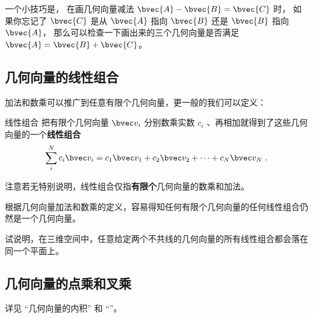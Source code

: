 一个小技巧是， 在画几何向量减法 $\bvec{A} - \bvec{B} = \bvec{C}$ 时， 如果你忘记了 $\bvec{C}$ 是从 $\bvec{A}$ 指向 $\bvec{B}$ 还是 $\bvec{B}$ 指向 $\bvec{A}$， 那么可以检查一下画出来的三个几何向量是否满足 $\bvec{A} = \bvec{B} + \bvec{C}$。


\subsection{几何向量的线性组合}

加法和数乘可以推广到任意有限个几何向量，更一般的我们可以定义：
\begin{definition}{线性组合}
把有限个几何向量 $\bvec v_i$ 分别数乘实数 $c_i$ 、再相加就得到了这些几何向量的一个\textbf{线性组合}
\begin{equation}\label{eq_GVecOp_1}
\sum_i^N c_i \bvec v_i = c_1\bvec v_1 + c_2\bvec v_2 +\dots +c_N \bvec v_N~.
\end{equation}
\end{definition}
注意若无特别说明，线性组合仅指\textbf{有限个}几何向量的数乘和加法。


根据几何向量加法和数乘的定义，容易得知任何有限个几何向量的任何线性组合仍然是一个几何向量。

\begin{exercise}{}
试说明，在三维空间中，任意给定两个不共线的几何向量的所有线性组合都会落在同一个平面上。
\end{exercise}

\subsection{几何向量的点乘和叉乘}
详见 “几何向量的内积” 和 “”。
